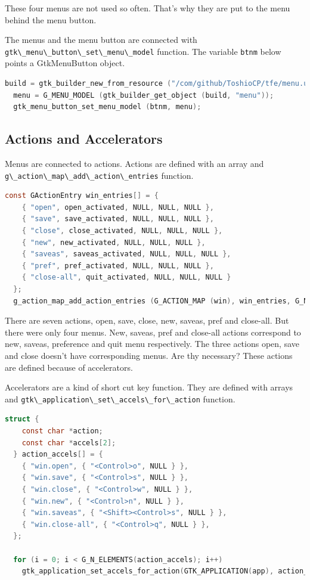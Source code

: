 These four menus are not used so often. That's why they are put to the
menu behind the menu button.

The menus and the menu button are connected with
\passthrough{\lstinline!gtk\_menu\_button\_set\_menu\_model!} function.
The variable \passthrough{\lstinline!btnm!} below points a GtkMenuButton
object.

\begin{lstlisting}[language=C]
  build = gtk_builder_new_from_resource ("/com/github/ToshioCP/tfe/menu.ui");
  menu = G_MENU_MODEL (gtk_builder_get_object (build, "menu"));
  gtk_menu_button_set_menu_model (btnm, menu);
\end{lstlisting}

\hypertarget{actions-and-accelerators}{%
\subsection{Actions and Accelerators}\label{actions-and-accelerators}}

Menus are connected to actions. Actions are defined with an array and
\passthrough{\lstinline!g\_action\_map\_add\_action\_entries!} function.

\begin{lstlisting}[language=C]
  const GActionEntry win_entries[] = {
    { "open", open_activated, NULL, NULL, NULL },
    { "save", save_activated, NULL, NULL, NULL },
    { "close", close_activated, NULL, NULL, NULL },
    { "new", new_activated, NULL, NULL, NULL },
    { "saveas", saveas_activated, NULL, NULL, NULL },
    { "pref", pref_activated, NULL, NULL, NULL },
    { "close-all", quit_activated, NULL, NULL, NULL }
  };
  g_action_map_add_action_entries (G_ACTION_MAP (win), win_entries, G_N_ELEMENTS (win_entries), nb);
\end{lstlisting}

There are seven actions, open, save, close, new, saveas, pref and
close-all. But there were only four menus. New, saveas, pref and
close-all actions correspond to new, saveas, preference and quit menu
respectively. The three actions open, save and close doesn't have
corresponding menus. Are thy necessary? These actions are defined
because of accelerators.

Accelerators are a kind of short cut key function. They are defined with
arrays and
\passthrough{\lstinline!gtk\_application\_set\_accels\_for\_action!}
function.

\begin{lstlisting}[language=C]
  struct {
    const char *action;
    const char *accels[2];
  } action_accels[] = {
    { "win.open", { "<Control>o", NULL } },
    { "win.save", { "<Control>s", NULL } },
    { "win.close", { "<Control>w", NULL } },
    { "win.new", { "<Control>n", NULL } },
    { "win.saveas", { "<Shift><Control>s", NULL } },
    { "win.close-all", { "<Control>q", NULL } },
  };

  for (i = 0; i < G_N_ELEMENTS(action_accels); i++)
    gtk_application_set_accels_for_action(GTK_APPLICATION(app), action_accels[i].action, action_accels[i].accels);
\end{lstlisting}


